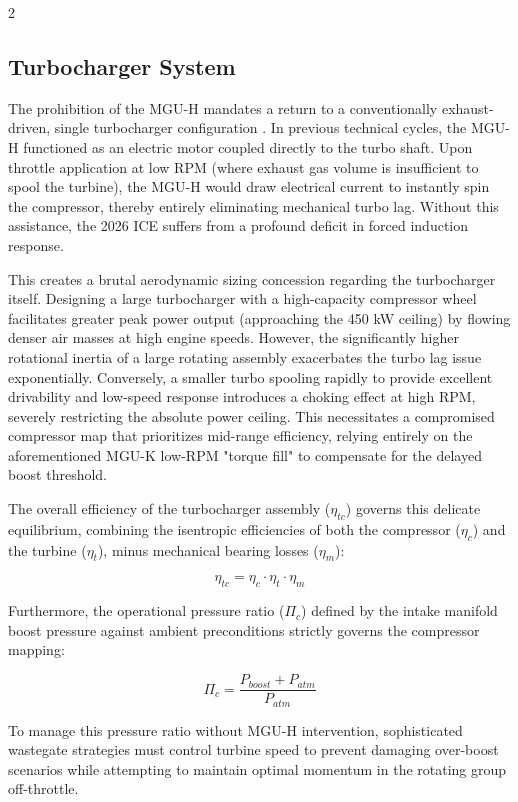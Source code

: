 \begin{multicols}{2}
\subsection{Turbocharger System}

The prohibition of the MGU-H mandates a return to a conventionally exhaust-driven, single turbocharger configuration \cite{FIA_2026_PU_Regulations}. In previous technical cycles, the MGU-H functioned as an electric motor coupled directly to the turbo shaft. Upon throttle application at low RPM (where exhaust gas volume is insufficient to spool the turbine), the MGU-H would draw electrical current to instantly spin the compressor, thereby entirely eliminating mechanical turbo lag. Without this assistance, the 2026 ICE suffers from a profound deficit in forced induction response.

This creates a brutal aerodynamic sizing concession regarding the turbocharger itself. Designing a large turbocharger with a high-capacity compressor wheel facilitates greater peak power output (approaching the 450 kW ceiling) by flowing denser air masses at high engine speeds. However, the significantly higher rotational inertia of a large rotating assembly exacerbates the turbo lag issue exponentially. Conversely, a smaller turbo spooling rapidly to provide excellent drivability and low-speed response introduces a choking effect at high RPM, severely restricting the absolute power ceiling. This necessitates a compromised compressor map that prioritizes mid-range efficiency, relying entirely on the aforementioned MGU-K low-RPM "torque fill" to compensate for the delayed boost threshold.

The overall efficiency of the turbocharger assembly ($\eta_{tc}$) governs this delicate equilibrium, combining the isentropic efficiencies of both the compressor ($\eta_c$) and the turbine ($\eta_t$), minus mechanical bearing losses ($\eta_m$):

\begin{equation} \label{eq:turbo_efficiency}
\eta_{tc} = \eta_c \cdot \eta_t \cdot \eta_m
\end{equation}

Furthermore, the operational pressure ratio ($\Pi_c$) defined by the intake manifold boost pressure against ambient preconditions strictly governs the compressor mapping:

\begin{equation} \label{eq:pressure_ratio}
\Pi_c = \frac{P_{boost} + P_{atm}}{P_{atm}}
\end{equation}

To manage this pressure ratio without MGU-H intervention, sophisticated wastegate strategies must control turbine speed to prevent damaging over-boost scenarios while attempting to maintain optimal momentum in the rotating group off-throttle. 
\end{multicols}
